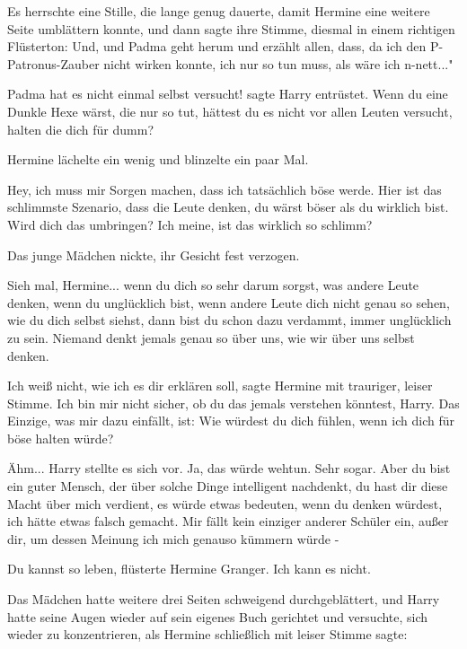 Es herrschte eine Stille, die lange genug dauerte, damit Hermine eine weitere
Seite umblättern konnte, und dann sagte ihre Stimme, diesmal in einem richtigen
Flüsterton: \glqq Und, und Padma geht herum und erzählt allen, dass, da ich den
P-Patronus-Zauber nicht wirken konnte, ich nur so tun muss, als wäre ich
n-nett..."

\glqq Padma hat es nicht einmal selbst versucht!\grqq{} sagte Harry entrüstet.
\glqq Wenn du eine Dunkle Hexe wärst, die nur so tut, hättest du es nicht vor
allen Leuten versucht, halten die dich für dumm?\grqq{}

Hermine lächelte ein wenig und blinzelte ein paar Mal.

\glqq Hey, ich muss mir Sorgen machen, dass ich tatsächlich böse werde. Hier ist
das schlimmste Szenario, dass die Leute denken, du wärst böser als du wirklich
bist. Wird dich das umbringen? Ich meine, ist das wirklich so schlimm?\grqq{}

Das junge Mädchen nickte, ihr Gesicht fest verzogen.

\glqq Sieh mal, Hermine... wenn du dich so sehr darum sorgst, was andere Leute
denken, wenn du unglücklich bist, wenn andere Leute dich nicht genau so sehen,
wie du dich selbst siehst, dann bist du schon dazu verdammt, immer unglücklich
zu sein. Niemand denkt jemals genau so über uns, wie wir über uns selbst
denken.\grqq{}

\glqq Ich weiß nicht, wie ich es dir erklären soll\grqq{}, sagte Hermine mit
trauriger, leiser Stimme. \glqq Ich bin mir nicht sicher, ob du das jemals
verstehen könntest, Harry. Das Einzige, was mir dazu einfällt, ist: Wie würdest
du dich fühlen, wenn ich dich für böse halten würde?\grqq{}

\glqq Ähm...\grqq{} Harry stellte es sich vor. \glqq Ja, das würde wehtun. Sehr
sogar. Aber du bist ein guter Mensch, der über solche Dinge intelligent
nachdenkt, du hast dir diese Macht über mich verdient, es würde etwas bedeuten,
wenn du denken würdest, ich hätte etwas falsch gemacht. Mir fällt kein einziger
anderer Schüler ein, außer dir, um dessen Meinung ich mich genauso kümmern würde
-\grqq{}

\glqq Du kannst so leben\grqq{}, flüsterte Hermine Granger. \glqq Ich kann es
nicht.\grqq{}

Das Mädchen hatte weitere drei Seiten schweigend durchgeblättert, und Harry
hatte seine Augen wieder auf sein eigenes Buch gerichtet und versuchte, sich
wieder zu konzentrieren, als Hermine schließlich mit leiser Stimme sagte:

